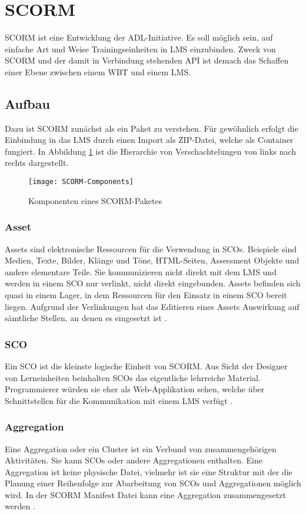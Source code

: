 \section{SCORM}\label{ref:scorm}
\ac{SCORM} ist eine Entwicklung der \ac{ADL}-Initiative. Es soll möglich sein,
auf einfache Art und Weise Trainingseinheiten in LMS einzubinden. Zweck von
SCORM und der damit in Verbindung stehenden \ac{API} ist demach das Schaffen einer
Ebene zwischen einem WBT und einem LMS.

\subsection{Aufbau}
Dazu ist SCORM zunächst als ein Paket zu verstehen. Für gewöhnlich erfolgt die
Einbindung in das LMS durch einen Import als ZIP-Datei, welche als Container
fungiert. In Abbildung \ref{pic:scormComponents} ist die Hierarchie von
Verschachtelungen von links nach rechts dargestellt.
\begin{figure}[ht]
\centering
\texttt{[image: SCORM-Components]}
\caption{Komponenten eines
SCORM-Paketes\footnotemark}\label{pic:scormComponents}
\end{figure}

\subsubsection{Asset}
Assets sind elektronische Ressourcen für die Verwendung in SCOs. Beispiele sind
Medien, Texte, Bilder, Klänge und Töne, HTML-Seiten, Assessment Objekte und
andere elementare Teile. Sie kommunizieren nicht direkt mit dem LMS und werden
in einem SCO nur verlinkt, nicht direkt eingebunden. Assets befinden sich quasi
in einem Lager, in dem Ressourcen für den Einsatz in einem SCO bereit liegen.
Aufgrund der Verlinkungen hat das Editieren eines Assets Auswirkung auf
sämtliche Stellen, an denen es eingesetzt ist \cite{adl:2011}.

\subsubsection{SCO}
Ein \ac{SCO} ist die kleinste logische Einheit von SCORM. Aus Sicht
der Designer von Lerneinheiten beinhalten SCOs das eigentliche
lehrreiche Material. Programmierer würden sie eher als
Web-Applikation sehen, welche über Schnittstellen für die
Kommunikation mit einem LMS verfügt \cite{adl:2011}.

\subsubsection{Aggregation}
Eine Aggregation oder ein Cluster ist ein Verbund von zusammengehörigen
Aktivitäten. Sie kann SCOs oder andere Aggregationen enthalten. Eine Aggregation
ist keine physische Datei, vielmehr ist sie eine Struktur mit der die Planung
einer Reihenfolge zur Abarbeitung von SCOs und Aggregationen möglich wird. In
der SCORM Manifest Datei kann eine Aggregation zusammengesetzt werden
\cite{adl:2011}.

